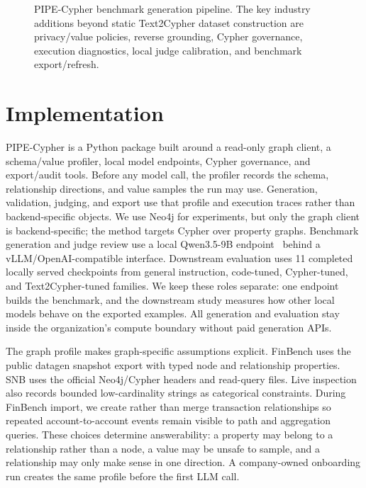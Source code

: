 \documentclass[11pt]{article}
\begin{document}
\begin{figure}[t]
\centering
\resizebox{\textwidth}{!}{}
\caption{PIPE-Cypher benchmark generation pipeline. The key industry additions beyond static Text2Cypher dataset construction are privacy/value policies, reverse grounding, Cypher governance, execution diagnostics, local judge calibration, and benchmark export/refresh.}
\label{fig:pipeline_overview}
\end{figure}



\section{Implementation}
PIPE-Cypher is a Python package built around a read-only graph client, a schema/value profiler, local model endpoints, Cypher governance, and export/audit tools. Before any model call, the profiler records the schema, relationship directions, and value samples the run may use. Generation, validation, judging, and export use that profile and execution traces rather than backend-specific objects. We use Neo4j for experiments, but only the graph client is backend-specific; the method targets Cypher over property graphs. Benchmark generation and judge review use a local Qwen3.5-9B endpoint~\citep{qwen2026qwen35hf} behind a vLLM/OpenAI-compatible interface. Downstream evaluation uses 11 completed locally served checkpoints from general instruction, code-tuned, Cypher-tuned, and Text2Cypher-tuned families. We keep these roles separate: one endpoint builds the benchmark, and the downstream study measures how other local models behave on the exported examples. All generation and evaluation stay inside the organization's compute boundary without paid generation APIs.

The graph profile makes graph-specific assumptions explicit. FinBench uses the public datagen snapshot export with typed node and relationship properties. SNB uses the official Neo4j/Cypher headers and read-query files. Live inspection also records bounded low-cardinality strings as categorical constraints. During FinBench import, we create rather than merge transaction relationships so repeated account-to-account events remain visible to path and aggregation queries. These choices determine answerability: a property may belong to a relationship rather than a node, a value may be unsafe to sample, and a relationship may only make sense in one direction. A company-owned onboarding run creates the same profile before the first LLM call.
\end{document}
